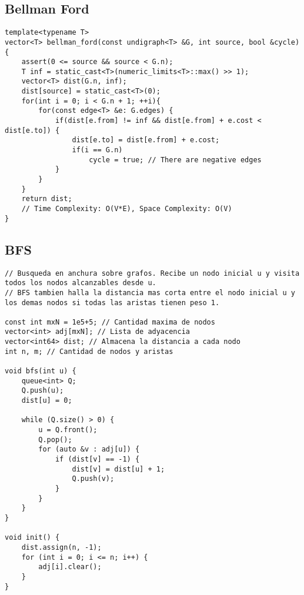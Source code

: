 \documentclass[10pt,letterpaper,twocolumn,twosided]{article}
\begin{document}
\subsection{Bellman Ford}
\begin{lstlisting}
template<typename T>
vector<T> bellman_ford(const undigraph<T> &G, int source, bool &cycle) {
    assert(0 <= source && source < G.n);
    T inf = static_cast<T>(numeric_limits<T>::max() >> 1);
    vector<T> dist(G.n, inf);
    dist[source] = static_cast<T>(0);
    for(int i = 0; i < G.n + 1; ++i){
        for(const edge<T> &e: G.edges) {
            if(dist[e.from] != inf && dist[e.from] + e.cost < dist[e.to]) {
                dist[e.to] = dist[e.from] + e.cost;
                if(i == G.n)
                    cycle = true; // There are negative edges
            }
        }
    }
    return dist;
    // Time Complexity: O(V*E), Space Complexity: O(V)
}
\end{lstlisting}

\subsection{BFS}
\begin{lstlisting}
// Busqueda en anchura sobre grafos. Recibe un nodo inicial u y visita todos los nodos alcanzables desde u.
// BFS tambien halla la distancia mas corta entre el nodo inicial u y los demas nodos si todas las aristas tienen peso 1.

const int mxN = 1e5+5; // Cantidad maxima de nodos
vector<int> adj[mxN]; // Lista de adyacencia
vector<int64> dist; // Almacena la distancia a cada nodo
int n, m; // Cantidad de nodos y aristas

void bfs(int u) {
    queue<int> Q;
    Q.push(u);
    dist[u] = 0;

    while (Q.size() > 0) {
        u = Q.front();
        Q.pop();
        for (auto &v : adj[u]) {
            if (dist[v] == -1) {
                dist[v] = dist[u] + 1;
                Q.push(v);
            }
        }
    }
}

void init() {
    dist.assign(n, -1);
    for (int i = 0; i <= n; i++) {
        adj[i].clear();
    }
}
\end{lstlisting}
\end{document}
